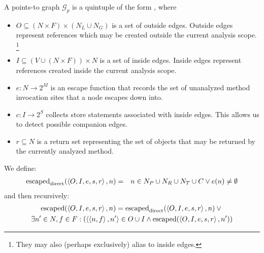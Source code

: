 \documentclass[11pt,notitlepage]{article}
\begin{document}
A points-to graph $\mathcal{G}_p$ is a quintuple of the form , where
\begin{itemize}
\item $O \subseteq (N\times F)\times(N_L \cup N_G)$ is a set of
outside edges.  Outside edges represent references which may be
created outside the current analysis scope.%
\footnote{They may also (perhaps exclusively) alias to inside edges.}
\item $I \subseteq (V\cup(N\times F))\times N$ is a set of inside
edges.  Inside edges represent references created inside the current
analysis scope.
\item $e:N\to 2^M$ is an escape function that records the set of
unanalyzed method invocation sites that a node escapes down into.
\item $c:I\to 2^S$ collects store statements associated with
inside edges.  This allows us to detect possible companion edges.
\item $r \subseteq N$ is a return set representing the set of objects
that may be returned by the currently analyzed method.
\end{itemize}
We define:
\begin{eqnarray*}
\text{escaped}_\text{direct}(\left\langle O,I,e,s,r \right\rangle, n) &=&
 n\in N_P \cup N_R \cup N_T \cup C
 \vee
 e(n)\neq\emptyset
\end{eqnarray*}
and then recursively:
\begin{multline*}
\text{escaped}%
              (\tuple{O,I,e,s,r},n) =
 \text{escaped}_\text{direct}(\tuple{O,I,e,s,r},n) \vee {}
\\
 \exists n'\in N,f\in F : \left(\tuple{\tuple{n,f},n'}\in O\cup I
 \wedge
 \text{escaped}%
               (\tuple{O,I,e,s,r},n')\right)
\end{multline*}
\end{document}

